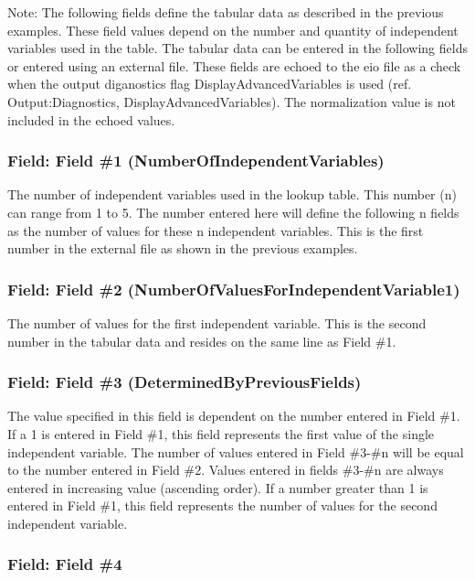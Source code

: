 Note: The following fields define the tabular data as described in the previous examples. These field values depend on the number and quantity of independent variables used in the table. The tabular data can be entered in the following fields or entered using an external file. These fields are echoed to the eio file as a check when the output diganostics flag DisplayAdvancedVariables is used (ref. Output:Diagnostics, DisplayAdvancedVariables). The normalization value is not included in the echoed values.

\subsubsection{Field: Field \#1 (NumberOfIndependentVariables)}\label{field-field-1-numberofindependentvariables}

The number of independent variables used in the lookup table. This number (n) can range from 1 to 5. The number entered here will define the following n fields as the number of values for these n independent variables. This is the first number in the external file as shown in the previous examples.

\subsubsection{Field: Field \#2 (NumberOfValuesForIndependentVariable1)}\label{field-field-2-numberofvaluesforindependentvariable1}

The number of values for the first independent variable. This is the second number in the tabular data and resides on the same line as Field \#1.

\subsubsection{Field: Field \#3 (DeterminedByPreviousFields)}\label{field-field-3-determinedbypreviousfields}

The value specified in this field is dependent on the number entered in Field \#1. If a 1 is entered in Field \#1, this field represents the first value of the single independent variable. The number of values entered in Field \#3-\#n will be equal to the number entered in Field \#2. Values entered in fields \#3-\#n are always entered in increasing value (ascending order). If a number greater than 1 is entered in Field \#1, this field represents the number of values for the second independent variable.

\subsubsection{Field: Field \#4}\label{field-field-4}


